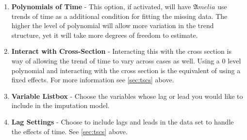 \documentclass[12pt,titlepage]{article}
\begin{document}
\begin{enumerate}
\item \textbf{Polynomials of Time} - This option, if activated, will
  have ${\mathfrak Amelia}$ use trends of time as a additional
  condition for fitting the missing data.  The higher the level of
  polynomial will allow more variation in the trend structure, yet it
  will take more degrees of freedom to estimate.
\item \textbf{Interact with Cross-Section} - Interacting this with the
  cross section is way of allowing the trend of time to vary across
  cases as well.  Using a 0 level polynomial and interacting with the
  cross section is the equivalent of using a fixed effects.  For more
  information see \ref{sec:tscs} above.
\item \textbf{Variable Listbox} - Choose the variables whose lag or lead you
  would like to include in the imputation model. 
\item \textbf{Lag Settings} - Choose to include lags and leads in the
  data set to handle the effects of time.  See \ref{sec:tscs} above.
\end{enumerate}
\end{document}
